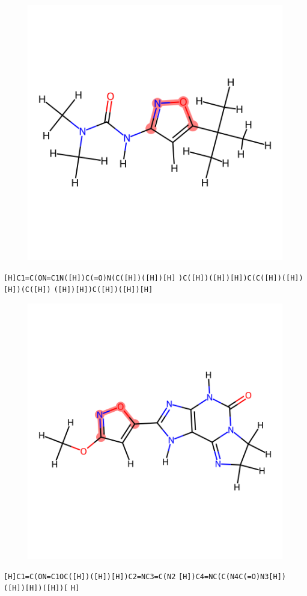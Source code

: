 \documentclass{article}
\begin{document}
\begin{figure}[ht]
\centering
    \includegraphics{mol202.png}
\end{figure}
\verb|[H]C1=C(ON=C1N([H])C(=O)N(C([H])([H])[H]| \verb|)C([H])([H])[H])C(C([H])([H])[H])(C([H])| \verb|([H])[H])C([H])([H])[H]|

\begin{figure}[ht]
\centering
    \includegraphics{mol203.png}
\end{figure}
\verb|[H]C1=C(ON=C1OC([H])([H])[H])C2=NC3=C(N2| \verb|[H])C4=NC(C(N4C(=O)N3[H])([H])[H])([H])[| \verb|H]|
\end{document}
